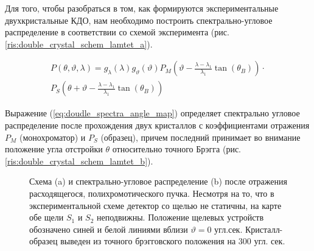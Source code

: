
Для того, чтобы разобраться в том, как формируются экспериментальные
двухкристальные КДО, нам необходимо построить спектрально-угловое распределение
в соответствии со схемой эксперимента (рис. \ref{ris:double_crystal_schem_lamtet_a}).

\begin{eqnarray} \label{eq:doudle_spectra_angle_map}
  P(\theta,\vartheta,\lambda) = g_{\lambda}(\lambda)g_{\vartheta}(\vartheta) P_M \left(\vartheta - \frac{\lambda - \lambda_1}{\lambda_1}\tan(\theta_B) \right) \cdot \nonumber \\
   P_S \left(\theta + \vartheta - \frac{\lambda - \lambda_1}{\lambda_1}\tan(\theta_B)\right)
 \end{eqnarray}

Выражение (\ref{eq:doudle_spectra_angle_map}) определяет спектрально угловое распределение после прохождения двух кристаллов с
коэффициентами отражения  $P_M$ (монохроматор) и $P_S$ (образец), причем последний принимает во внимание положение угла отстройки $\theta$ относительно
точного Брэгга (рис. \ref{ris:double_crystal_schem_lamtet_b}).

\begin{figure}[H]
  \centering
  \hfill

  \caption{Схема (a) и спектрально-угловое распределение (b) после отражения расходящегося, полихромотического пучка.
  Несмотря на то, что в экспериментальной схеме детектор со щелью не статичны, на карте обе щели $S_1$ и $S_2$ неподвижны.
  Положение щелевых устройств обозначено синей и белой линиями вблизи $\vartheta = 0$ угл.сек. Кристалл-образец
  выведен из точного брэгговского положения на 300 угл. сек. }
  \label{ris:double_crystal_schem_lamtet}
\end{figure}

